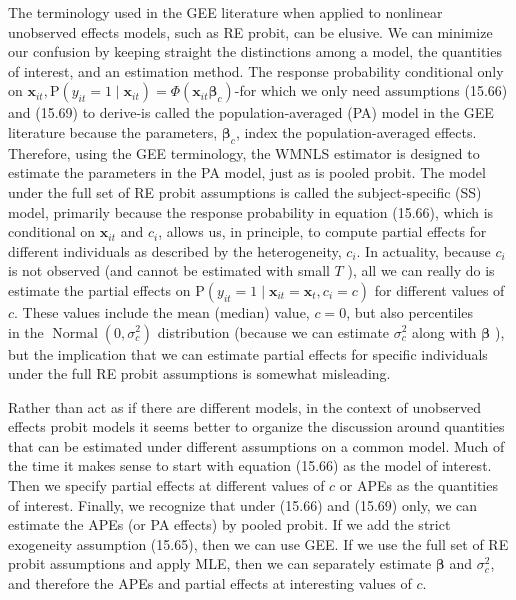 \documentclass[10pt]{article}
\begin{document}
The terminology used in the GEE literature when applied to nonlinear unobserved effects models, such as RE probit, can be elusive. We can minimize our confusion by keeping straight the distinctions among a model, the quantities of interest, and an estimation method. The response probability conditional only on $\mathbf{x}_{i t}, \mathrm{P}\left(y_{i t}=1 \mid \mathbf{x}_{i t}\right) =\Phi\left(\mathbf{x}_{i t} \boldsymbol{\beta}_{c}\right)$-for which we only need assumptions (15.66) and (15.69) to derive-is called the population-averaged (PA) model in the GEE literature because the parameters, $\boldsymbol{\beta}_{c}$, index the population-averaged effects. Therefore, using the GEE terminology, the WMNLS estimator is designed to estimate the parameters in the PA model, just as is pooled probit. The model under the full set of RE probit assumptions is called the subject-specific (SS) model, primarily because the response probability in equation (15.66), which is conditional on $\mathbf{x}_{i t}$ and $c_{i}$, allows us, in principle, to compute partial effects for different individuals as described by the heterogeneity, $c_{i}$. In actuality, because $c_{i}$ is not observed (and cannot be estimated with small $T$ ), all we can really do is estimate the partial effects on $\mathrm{P}\left(y_{i t}=1 \mid \mathbf{x}_{i t}=\mathbf{x}_{t}, c_{i}=c\right)$ for different values of $c$. These values include the mean (median) value, $c=0$, but also percentiles\\
in the $\operatorname{Normal}\left(0, \sigma_{c}^{2}\right)$ distribution (because we can estimate $\sigma_{c}^{2}$ along with $\boldsymbol{\beta}$ ), but the implication that we can estimate partial effects for specific individuals under the full RE probit assumptions is somewhat misleading.

Rather than act as if there are different models, in the context of unobserved effects probit models it seems better to organize the discussion around quantities that can be estimated under different assumptions on a common model. Much of the time it makes sense to start with equation (15.66) as the model of interest. Then we specify partial effects at different values of $c$ or APEs as the quantities of interest. Finally, we recognize that under (15.66) and (15.69) only, we can estimate the APEs (or PA effects) by pooled probit. If we add the strict exogeneity assumption (15.65), then we can use GEE. If we use the full set of RE probit assumptions and apply MLE, then we can separately estimate $\boldsymbol{\beta}$ and $\sigma_{c}^{2}$, and therefore the APEs and partial effects at interesting values of $c$.
\end{document}
